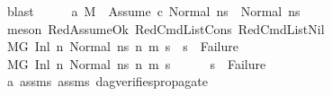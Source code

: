 \begin{isabellebody}
\ blast\isanewline
\ \ \isamarkupfalse%
\ \isamarkupfalse%
\ a{}{\isacharcolon}{\kern0pt}\ {\isachardoublequoteopen}{\isacharparenleft}{\kern0pt}M{\isacharcomma}{\kern0pt}{\isasymLambda}{\isacharcomma}{\kern0pt}{\isasymGamma}{\isacharcomma}{\kern0pt}{\isasymOmega}\ {\isasymturnstile}\ {\isasymlangle}{\isacharbrackleft}{\kern0pt}Assume\ c{\isacharbrackright}{\kern0pt}{\isacharcomma}{\kern0pt}\ Normal\ ns{}{\isasymrangle}\ {\isacharbrackleft}{\kern0pt}{\isasymrightarrow}{\isacharbrackright}{\kern0pt}\ {\isacharparenleft}{\kern0pt}Normal\ ns{}{\isacharparenright}{\kern0pt}{\isacharparenright}{\kern0pt}{\isachardoublequoteclose}\ \isamarkupfalse%
\ {\isacharparenleft}{\kern0pt}meson\ RedAssumeOk\ RedCmdListCons\ RedCmdListNil{\isacharparenright}{\kern0pt}\isanewline
\ \ \isamarkupfalse%
\ {\isachardoublequoteopen}{\isacharparenleft}{\kern0pt}M{\isacharcomma}{\kern0pt}{\isasymLambda}{\isacharcomma}{\kern0pt}{\isasymGamma}{\isacharcomma}{\kern0pt}{\isasymOmega}{\isacharcomma}{\kern0pt}G\ {\isasymturnstile}{\isacharparenleft}{\kern0pt}Inl\ n{}{\isacharcomma}{\kern0pt}\ Normal\ ns{}{\isacharparenright}{\kern0pt}\ {\isacharminus}{\kern0pt}n{\isasymrightarrow}{\isacharasterisk}{\kern0pt}\ {\isacharparenleft}{\kern0pt}m{}{\isacharcomma}{\kern0pt}\ s{}{\isacharparenright}{\kern0pt}{\isacharparenright}{\kern0pt}\ {\isasymLongrightarrow}\ s{}\ {\isasymnoteq}\ Failure{\isachardoublequoteclose}\ \isanewline
\ \ \isamarkupfalse%
\ {\isacharminus}{\kern0pt}\isanewline
\ \ \ \ \isamarkupfalse%
\ {\isachardoublequoteopen}{\isacharparenleft}{\kern0pt}M{\isacharcomma}{\kern0pt}{\isasymLambda}{\isacharcomma}{\kern0pt}{\isasymGamma}{\isacharcomma}{\kern0pt}{\isasymOmega}{\isacharcomma}{\kern0pt}G\ {\isasymturnstile}{\isacharparenleft}{\kern0pt}Inl\ n{}{\isacharcomma}{\kern0pt}\ Normal\ ns{}{\isacharparenright}{\kern0pt}\ {\isacharminus}{\kern0pt}n{\isasymrightarrow}{\isacharasterisk}{\kern0pt}\ {\isacharparenleft}{\kern0pt}m{}{\isacharcomma}{\kern0pt}\ s{}{\isacharparenright}{\kern0pt}{\isacharparenright}{\kern0pt}{\isachardoublequoteclose}\isanewline
\ \ \ \ \isamarkupfalse%
\ {\isachardoublequoteopen}s{}\ {\isasymnoteq}\ Failure{\isachardoublequoteclose}\ \isamarkupfalse%
\ a{}\ assms{\isacharparenleft}{\kern0pt}{}{\isacharminus}{\kern0pt}{}{\isacharparenright}{\kern0pt}\ assms{\isacharparenleft}{\kern0pt}{}{\isacharparenright}{\kern0pt}\ dag{\isacharunderscore}{\kern0pt}verifies{\isacharunderscore}{\kern0pt}propagate\ \isamarkupfalse%

\end{isabellebody}
